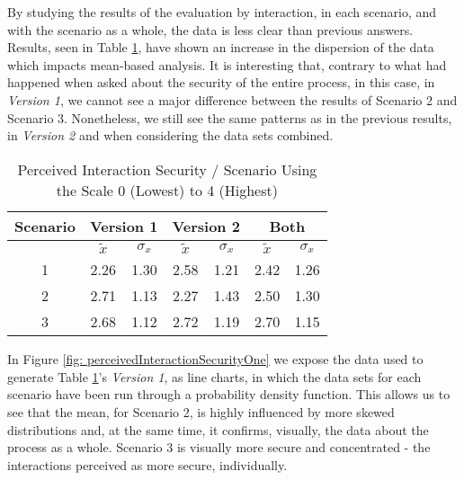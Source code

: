 By studying the results of the evaluation by interaction, in each scenario, and with the scenario as a whole, the data is less clear than previous answers. Results, seen in Table \ref{tab: perceivedInteractionSecurity}, have shown an increase in the dispersion of the data which impacts mean-based analysis. It is interesting that, contrary to what had happened when asked about the security of the entire process, in this case, in \textit{Version 1}, we cannot see a major difference between the results of Scenario 2 and Scenario 3. Nonetheless, we still see the same patterns as in the previous results, in \textit{Version 2} and when considering the data sets combined. 

\begin{table}[htb]
    \centering
    \caption{Perceived Interaction Security / Scenario Using the Scale 0 (Lowest) to 4 (Highest)}
    \label{tab: perceivedInteractionSecurity}
    \begin{tabular}{c|cccc|cc}
    \hline 
    Scenario & \multicolumn{2}{c}{\bf Version 1} & \multicolumn{2}{c}{\bf Version 2} \vrule & \multicolumn{2}{c}{\bf Both} \\
    \hline
     & $\tilde{x}$ & $\sigma_{x}$ & $\tilde{x}$ & $\sigma_{x}$ & $\tilde{x}$ & $\sigma_{x}$ \\
    \hline
    1 & 2.26 & 1.30 & 2.58 & 1.21 & 2.42 & 1.26 \\
    2 & 2.71 & 1.13 & 2.27 & 1.43 & 2.50 & 1.30 \\
    3 & 2.68 & 1.12 & 2.72 & 1.19 & 2.70 & 1.15 \\
    \hline
    \end{tabular}
\end{table}

In Figure \ref{fig: perceivedInteractionSecurityOne} we expose the data used to generate Table \ref{tab: perceivedInteractionSecurity}'s \textit{Version 1}, as line charts, in which the data sets for each scenario have been run through a probability density function. This allows us to see that the mean, for Scenario 2, is highly influenced by more skewed distributions and, at the same time, it confirms, visually, the data about the process as a whole. Scenario 3 is visually more secure and concentrated - the interactions perceived as more secure, individually.

